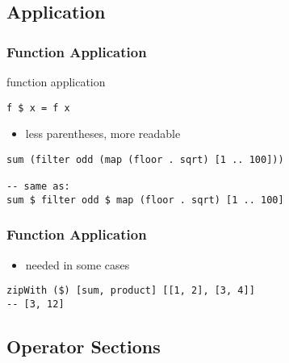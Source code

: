 \documentclass[dvipsnames]{beamer}
\theoremstyle{plain}
\begin{document}
\subsection{Application}

\begin{frame}[fragile]
  \frametitle{Function Application}

  \begin{block}{function application}
    \begin{lstlisting}
f $ x = f x
    \end{lstlisting}
  \end{block}

  \begin{itemize}
    \item less parentheses, more readable
  \end{itemize}

  \begin{exampleblock}{}
    \begin{lstlisting}
sum (filter odd (map (floor . sqrt) [1 .. 100]))

-- same as:
sum $ filter odd $ map (floor . sqrt) [1 .. 100]
    \end{lstlisting}
  \end{exampleblock}
\end{frame}

\begin{frame}[fragile]
  \frametitle{Function Application}

  \begin{itemize}
    \item needed in some cases
  \end{itemize}

  \begin{exampleblock}{}
    \begin{lstlisting}
zipWith ($) [sum, product] [[1, 2], [3, 4]]
-- [3, 12]
    \end{lstlisting}
  \end{exampleblock}
\end{frame}

\subsection{Operator Sections}
\end{document}
